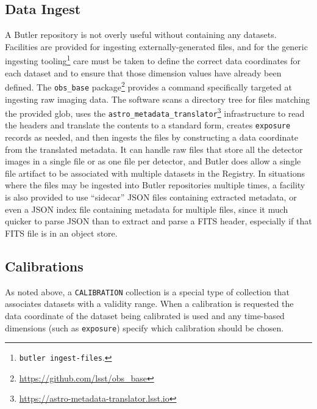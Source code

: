 \documentclass[]{spie}
\begin{document}
\subsection{Data Ingest}

A Butler repository is not overly useful without containing any datasets.
Facilities are provided for ingesting externally-generated files, and for the generic ingesting tooling\footnote{\texttt{butler ingest-files}.} care must be taken to define the correct data coordinates for each dataset and to ensure that those dimension values have already been defined.
The \texttt{obs\_base} package\footnote{\url{https://github.com/lsst/obs_base}} provides a command specifically targeted at ingesting raw imaging data.
The software scans a directory tree for files matching the provided glob, uses the \texttt{astro\_metadata\_translator}\footnote{\url{https://astro-metadata-translator.lsst.io}} infrastructure to read the headers and translate the contents to a standard form, creates \texttt{exposure} records as needed, and then ingests the files by constructing a data coordinate from the translated metadata.
It can handle raw files that store all the detector images in a single file or as one file per detector, and Butler does allow a single file artifact to be associated with multiple datasets in the Registry.
In situations where the files may be ingested into Butler repositories multiple times, a facility is also provided to use ``sidecar'' JSON files containing extracted metadata, or even a JSON index file containing metadata for multiple files, since it much quicker to parse JSON than to extract and parse a FITS header, especially if that FITS file is in an object store.

\subsection{Calibrations}

As noted above, a \texttt{CALIBRATION} collection is a special type of collection that associates datasets with a validity range.
When a calibration is requested the data coordinate of the dataset being calibrated is used and any time-based dimensions (such as \texttt{exposure}) specify which calibration should be chosen.
\end{document}
